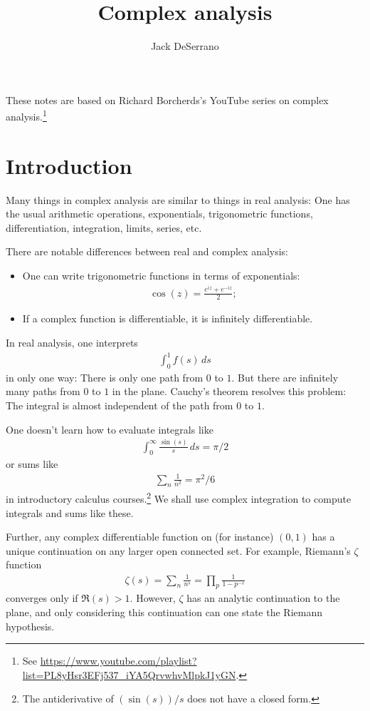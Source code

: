 \documentclass[11pt, oneside,margin=1in]{article}
\title{Complex analysis}
\author{Jack DeSerrano}
\begin{document}
\ifams
    \vspace*{\fill}
\fi
\maketitle
These notes are based on Richard Borcherds's YouTube series on complex analysis.\footnote{See \url{https://www.youtube.com/playlist?list=PL8yHsr3EFj537_iYA5QrvwhvMlpkJ1yGN}.}
\ifams
	\vspace*{\fill}
\fi
\newpage
\section{Introduction}
Many things in complex analysis are similar to things in real analysis: One has the usual arithmetic operations, exponentials, trigonometric functions, differentiation, integration, limits, series, etc.

There are notable differences between real and complex analysis:
\begin{itemize}
	\item One can write trigonometric functions in terms of exponentials:
		\begin{align*}
			\cos (z) = \frac{e^{iz} + e^{-iz}}{2};
		\end{align*}
	\item If a complex function is differentiable, it is infinitely differentiable.
\end{itemize}

In real analysis, one interprets
\begin{align*}
	\int_{0}^{1} f(s)   \, ds
\end{align*}
in only one way: There is only one path from $0$ to $1$. But there are infinitely many paths from $0$ to $1$ in the plane. Cauchy's theorem resolves this problem: The integral is almost independent of the path from $0$ to $1$.

One doesn't learn how to evaluate integrals like
\begin{align*}
	\int_{0}^{\infty} \frac{\sin (s)}{s}  \, ds = \pi/2
\end{align*}
or sums like
\begin{align*}
	\sum_n \frac{1}{n^2} = \pi^2/6
\end{align*}
in introductory calculus courses.\footnote{The antiderivative of $(\sin (s))/s$ does not have a closed form.} We shall use complex integration to compute integrals and sums like these.

Further, any complex differentiable function on (for instance) $(0,1)$ has a unique continuation on any larger open connected set. For example, Riemann's $\zeta$ function
 \begin{align*}
	\zeta (s)= \sum_n  \frac{1}{n^s}= \prod_{p} \frac{1}{1-p^{-s}}
\end{align*}
converges only if $\Re(s) > 1$. However, $\zeta$ has an analytic continuation to the plane, and only considering this continuation can one state the Riemann hypothesis. 
\end{document}
